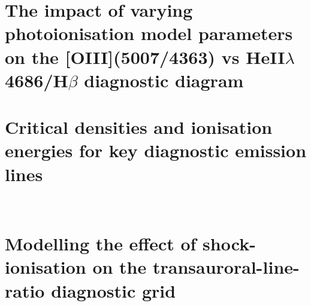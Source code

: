 \documentclass[12pt, twoside, openright]{report}
\begin{document}
\chapter[Photoionisation modelling of the {[}OIII{]}(5007/4363) vs HeII$\lambda$4686/H$\beta$ diagnostic diagram]{The impact of varying photoionisation model parameters on the {[}OIII{]}(5007/4363) vs HeII$\lambda$4686/H$\beta$ diagnostic diagram}
\label{appendix: heii_hb_oiii_photoionisation_modelling}


\chapter{Critical densities and ionisation energies for key diagnostic emission lines}
\label{appendix: properties_of_warm_ionised_diagnostic_lines}


\newpage
\thispagestyle{plain}
~\newpage
\thispagestyle{plain}
~\newpage

\chapter{Modelling the effect of shock-ionisation on the transauroral-line-ratio diagnostic grid}
\label{appendix: tr_grid_shock_modelling}

\end{document}
